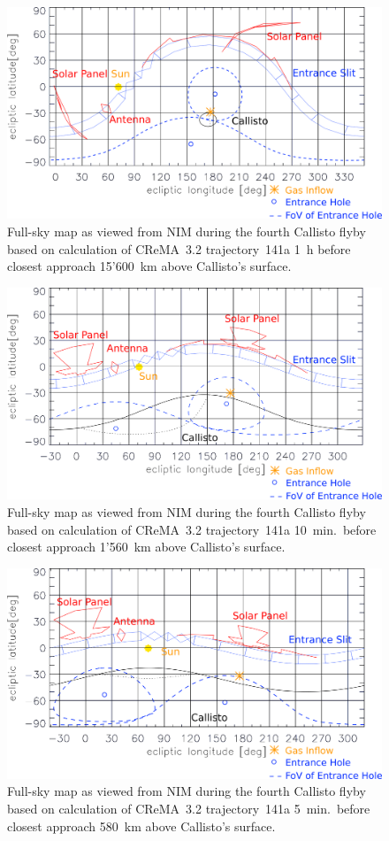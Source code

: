 	\begin{figure}[h!]
		\centering
		\includegraphics[width = .7\textwidth]{Bilder/NIM_pointing_2031JAN15185200.png}
		\caption{Full-sky map as viewed from NIM during the fourth Callisto flyby based on calculation of CReMA~3.2 trajectory~141a \cite{SOC_Crema3p2} 1~h before closest approach 15'600~km above Callisto's surface.}
		\label{fig:FlybyCal1852}
	\end{figure}
	\begin{figure}[h!]
		\centering
		\includegraphics[width = .7\textwidth]{Bilder/NIM_pointing_2031JAN15194200.png}
		\caption{Full-sky map as viewed from NIM during the fourth Callisto flyby based on calculation of CReMA~3.2 trajectory~141a \cite{SOC_Crema3p2} 10~min.\ before closest approach 1'560~km above Callisto's surface.}
		\label{fig:FlybyCal1942}
	\end{figure}
	\begin{figure}[h!]
		\centering
		\includegraphics[width = .7\textwidth]{Bilder/NIM_pointing_2031JAN15194700.png}
		\caption{Full-sky map as viewed from NIM during the fourth Callisto flyby based on calculation of CReMA~3.2 trajectory~141a \cite{SOC_Crema3p2} 5~min.\ before closest approach 580~km above Callisto's surface.}
		\label{fig:FlybyCal1947}
	\end{figure}
